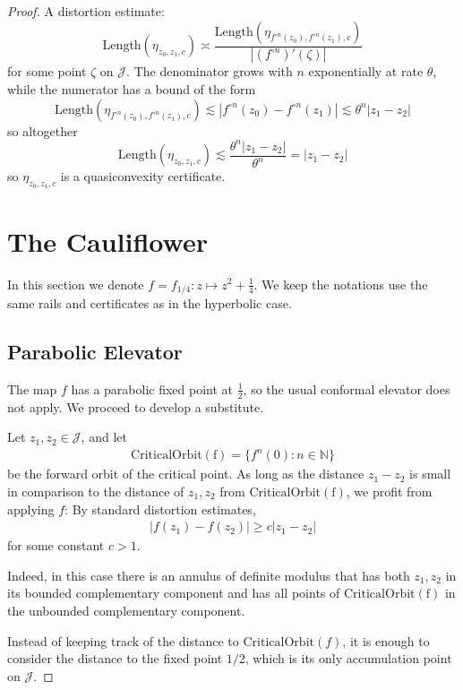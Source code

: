 \begin{proof}
A distortion estimate: 
\[
\mathrm{Length}\left(\eta_{z_{0},z_{1},c}\right)\asymp\frac{\mathrm{Length}\left(\eta_{f^{\circ n}(z_{0}),f^{\circ n}(z_{1}),c}\right)}{\left|\left(f^{\circ n}\right)'\left(\zeta\right)\right|}
\]
 for some point $\zeta$ on $\mathcal{J}$. The denominator grows
with $n$ exponentially at rate $\theta$, while the numerator has
a bound of the form 
\[
\mathrm{Length}\left(\eta_{f^{\circ n}(z_{0}),f^{\circ n}(z_{1}),c}\right)\lesssim\left|f^{\circ n}(z_{0})-f^{\circ n}(z_{1})\right|\lesssim\theta^{n}\left|z_{1}-z_{2}\right|
\]
 so altogether 
\[
\mathrm{Length}\left(\eta_{z_{0},z_{1},c}\right)\lesssim\frac{\theta^{n}\left|z_{1}-z_{2}\right|}{\theta^{n}}=\left|z_{1}-z_{2}\right|
\]
 so $\eta_{z_{0},z_{1},c}$ is a quasiconvexity certificate.

\section{The Cauliflower}
In this section we denote  $f=f_{1/4}: z\mapsto z^2+ \frac 14$. We keep the notations
use the same rails and certificates as in the hyperbolic case.



\subsection{Parabolic Elevator}
The map $f$ has a parabolic fixed point at $\frac 12$, so the usual conformal elevator does not apply. We proceed to develop a substitute.


Let $z_1,z_2 \in \mathcal J$, and let
\begin{align*}
	\mathrm{CriticalOrbit(f)}=\{f^n(0): n \in \mathbb N\}
\end{align*} be the forward orbit of the critical point.
As long as the distance $z_1-z_2$ is small in comparison to the distance of $z_1,z_2$ from $\mathrm{CriticalOrbit(f)}$, we profit from applying $f$: By standard distortion estimates, 
\begin{align*}
|f(z_1)-f(z_2)|\geq c |z_1-z_2|
\end{align*}
for some constant $c>1$.

Indeed, in this case there is an annulus of definite modulus that has both $z_1,z_2$ in its bounded complementary component and has all points of $\mathrm{CriticalOrbit(f)}$ in the unbounded complementary component.

Instead of keeping track of the distance to $\mathrm{CriticalOrbit}(f)$, it is enough to consider the distance to the fixed point $1/2$, which is its only accumulation point on $\mathcal J$.


\end{proof}
